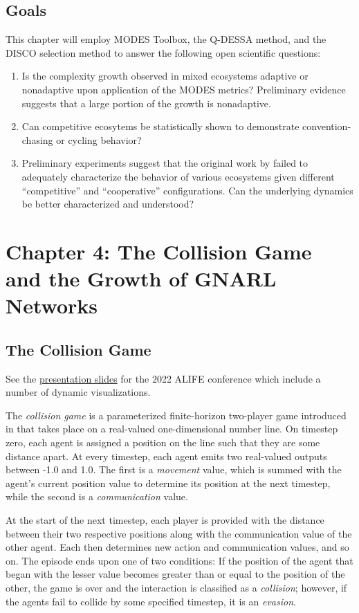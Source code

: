 \documentclass{article}
\begin{document}
\subsection*{Goals}
This chapter will employ MODES Toolbox, the Q-DESSA method, and the DISCO selection method to
answer the following open scientific questions:
\begin{enumerate}
    \item Is the complexity growth observed in mixed ecosystems adaptive or nonadaptive upon 
        application of the MODES metrics? Preliminary evidence suggests that a large portion of 
        the growth is nonadaptive.
    \item Can competitive ecosytems be statistically shown to demonstrate convention-chasing 
        or cycling behavior?
    \item Preliminary experiments suggest that the original work by \citet{moran2019evolving}
        failed to adequately characterize the behavior of various ecosystems given different
        ``competitive'' and ``cooperative'' configurations. Can the 
        underlying dynamics be better characterized and understood?
\end{enumerate}

\section*{Chapter 4: The Collision Game and the Growth of GNARL Networks}
\subsection*{The Collision Game}
See the \href{https://docs.google.com/presentation/d/1tklPPoT9hPfJkl9Fy-eHtzVZWNgh4hqUpuVcSHMLBWs/edit?usp=sharing}{presentation slides}
for the 2022 ALIFE conference which include a number of dynamic visualizations.

The \textit{collision game} is a parameterized finite-horizon two-player game introduced in 
\citet{willkens2022} that takes place on a real-valued one-dimensional number line. On 
timestep zero, each agent is assigned a position on the line such that they are some distance 
apart. At every timestep, each agent emits two real-valued outputs between -1.0 and 1.0.
The first is a \textit{movement} value, which is summed with the agent's current position value 
to determine its position at the next timestep, while the second is a \textit{communication} value. 

At the start of the next timestep, each player is provided with the distance between their two 
respective positions along with the communication value of the other agent. Each then determines 
new action and communication values, and so on. The episode ends upon one of two conditions: If 
the position of the agent that began with the lesser value becomes greater than or equal to the 
position of the other, the game is over and the interaction is classified as a \textit{collision}; 
however, if the agents fail to collide by some specified timestep, it is an \textit{evasion}. 
\end{document}
